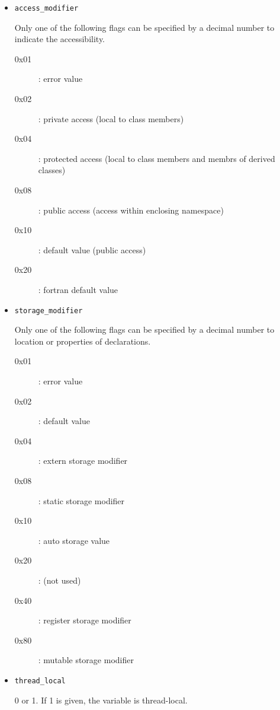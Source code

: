 \begin{itemize}
        Must be either const, volatile, or neither.
       \begin{description}
	\item[0x1]: unknown value (error)
	\item[0x2]: default value
	\item[0x4]: constant qualifier
	\item[0x8]: volatile qualifier
       \end{description}
 \item \texttt{access\_modifier}

       Only one of the following flags can be specified by a decimal
       number to indicate the accessibility.
       \begin{description}
	\item[0x01]: error value
	\item[0x02]: private access (local to class members)
	\item[0x04]: protected access (local to class members and membrs of derived classes)
	\item[0x08]: public access (access within enclosing namespace)
	\item[0x10]: default value (public access)
	\item[0x20]: fortran default value
       \end{description}
 \item \texttt{storage\_modifier}

       Only one of the following flags can be specified by a decimal
       number to location or properties of declarations.
       \begin{description}
	\item[0x01]: error value
	\item[0x02]: default value
	\item[0x04]: extern storage modifier
	\item[0x08]: static storage modifier
	\item[0x10]: auto storage value
	\item[0x20]: (not used)
	\item[0x40]: register storage modifier
	\item[0x80]: mutable storage modifier
       \end{description}

 \item \texttt{thread\_local}

       0 or 1. If 1 is given, the variable is thread-local.
\end{itemize}

